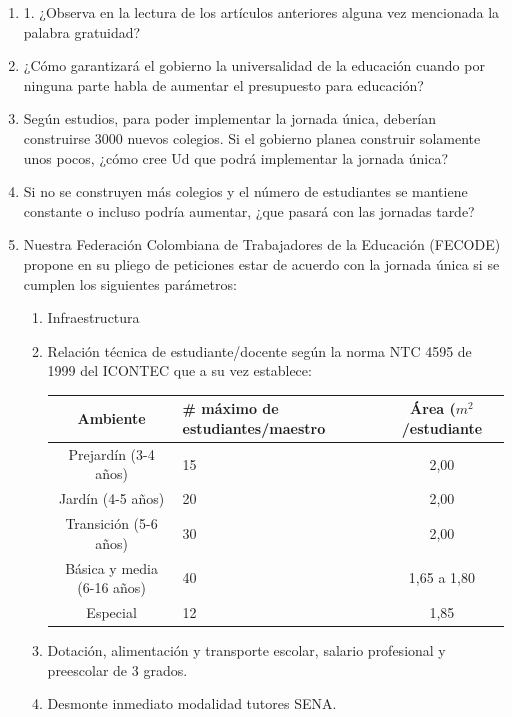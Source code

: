 \documentclass[10pt,twoside]{article}
\begin{document}
\begin{enumerate}
\item 1. ¿Observa en la lectura de los artículos anteriores alguna vez mencionada la palabra gratuidad?
\item ¿Cómo garantizará el gobierno la universalidad de la educación cuando por ninguna parte habla de aumentar el presupuesto para educación?
\item Según estudios, para poder implementar la jornada única, deberían construirse 3000 nuevos colegios. Si el gobierno planea construir solamente unos pocos, ¿cómo cree Ud que podrá implementar la jornada única?
\item Si no se construyen más colegios y el número de estudiantes se mantiene constante o incluso podría aumentar, ¿que pasará con las jornadas tarde?
\item Nuestra Federación Colombiana de Trabajadores de la Educación (FECODE) propone en su pliego de peticiones estar de acuerdo con la jornada única si se cumplen los siguientes parámetros:
\begin{enumerate}
\item Infraestructura
\item Relación técnica de estudiante/docente según la norma NTC 4595 de 1999 del ICONTEC que a su vez establece:
\begin{center}
\begin{tabular}{|c|p{3.5cm}|c|}
\hline 
Ambiente & \# máximo de estudiantes/maestro & Área ($m^{2}$/estudiante \\ 
\hline 
Prejardín (3-4 años) & \hspace*{1cm}15 & 2,00 \\ 
Jardín (4-5 años) & \hspace*{1cm}20 & 2,00 \\ 
Transición (5-6 años) & \hspace*{1cm}30 & 2,00 \\ 
Básica y media (6-16 años) & \hspace*{1cm}40 & 1,65 a 1,80 \\ 
Especial & \hspace*{1cm}12 & 1,85 \\ \hline
\end{tabular} 
\end{center}
\item Dotación, alimentación y transporte escolar, salario profesional y preescolar de 3 grados.
\item Desmonte inmediato modalidad tutores SENA.


\end{enumerate}
\end{enumerate}
\end{document}
